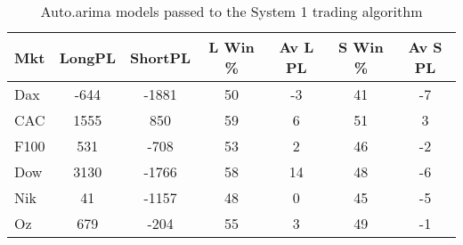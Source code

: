 \begin{table}[ht]
\centering
\caption[Sysytem 1 and auto.arima models]{Auto.arima models passed to the System 1 trading algorithm} 
\label{tab:chp_ts:arima1}
\begin{tabular}{lcccccc}
  \toprule Mkt & LongPL & ShortPL & L Win \% & Av L PL & S Win \% & Av S PL \\ 
  \midrule Dax & -644 & -1881 & 50 & -3 & 41 & -7 \\ 
  CAC & 1555 & 850 & 59 & 6 & 51 & 3 \\ 
  F100 & 531 & -708 & 53 & 2 & 46 & -2 \\ 
  Dow & 3130 & -1766 & 58 & 14 & 48 & -6 \\ 
  Nik & 41 & -1157 & 48 & 0 & 45 & -5 \\ 
  Oz & 679 & -204 & 55 & 3 & 49 & -1 \\ 
   \bottomrule \end{tabular}
\end{table}
